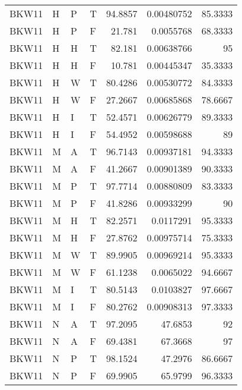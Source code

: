 \begin{longtable}{llllrrr}
    BKW11    & H     & P     & T          & 94.8857    & 0.00480752  & 85.3333  \\
    BKW11    & H     & P     & F          & 21.781     & 0.0055768   & 68.3333  \\
    BKW11    & H     & H     & T          & 82.181     & 0.00638766  & 95       \\
    BKW11    & H     & H     & F          & 10.781     & 0.00445347  & 35.3333  \\
    BKW11    & H     & W     & T          & 80.4286    & 0.00530772  & 84.3333  \\
    BKW11    & H     & W     & F          & 27.2667    & 0.00685868  & 78.6667  \\
    BKW11    & H     & I     & T          & 52.4571    & 0.00626779  & 89.3333  \\
    BKW11    & H     & I     & F          & 54.4952    & 0.00598688  & 89       \\
    BKW11    & M     & A     & T          & 96.7143    & 0.00937181  & 94.3333  \\
    BKW11    & M     & A     & F          & 41.2667    & 0.00901389  & 90.3333  \\
    BKW11    & M     & P     & T          & 97.7714    & 0.00880809  & 83.3333  \\
    BKW11    & M     & P     & F          & 41.8286    & 0.00933299  & 90       \\
    BKW11    & M     & H     & T          & 82.2571    & 0.0117291   & 95.3333  \\
    BKW11    & M     & H     & F          & 27.8762    & 0.00975714  & 75.3333  \\
    BKW11    & M     & W     & T          & 89.9905    & 0.00969214  & 95.3333  \\
    BKW11    & M     & W     & F          & 61.1238    & 0.0065022   & 94.6667  \\
    BKW11    & M     & I     & T          & 80.5143    & 0.0103827   & 97.6667  \\
    BKW11    & M     & I     & F          & 80.2762    & 0.00908313  & 97.3333  \\
    BKW11    & N     & A     & T          & 97.2095    & 47.6853     & 92       \\
    BKW11    & N     & A     & F          & 69.4381    & 67.3668     & 97       \\
    BKW11    & N     & P     & T          & 98.1524    & 47.2976     & 86.6667  \\
    BKW11    & N     & P     & F          & 69.9905    & 65.9799     & 96.3333  \\

\end{longtable}
